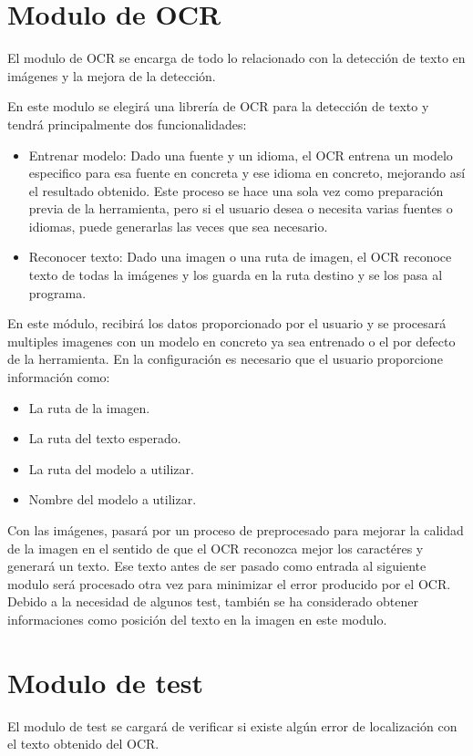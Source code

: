 \section{Modulo de OCR}
\label{sec:Modulo_OCR_Des}
El modulo de OCR se encarga de todo lo relacionado con la detección de texto en imágenes y la mejora de la detección.

En este modulo se elegirá una librería de OCR para la detección de texto y tendrá principalmente dos funcionalidades: 
\begin{itemize}
	\item Entrenar modelo: Dado una fuente y un idioma, el OCR entrena un modelo especifico para esa fuente en concreta y ese idioma en concreto, mejorando así el resultado obtenido. Este proceso se hace una sola vez como preparación previa de la herramienta, pero si el usuario desea o necesita varias fuentes o idiomas, puede generarlas las veces que sea necesario.
	\item Reconocer texto: Dado una imagen o una ruta de imagen, el OCR reconoce texto de todas la imágenes y los guarda en la ruta destino y se los pasa al programa. 
\end{itemize}
En este módulo, recibirá los datos proporcionado por el usuario y se procesará multiples imagenes con un modelo en concreto ya sea entrenado o el por defecto de la herramienta. En la configuración es necesario que el usuario proporcione información como:
\begin{itemize}
	\item La ruta de la imagen.
	\item La ruta del texto esperado.
	\item La ruta del modelo a utilizar.
	\item Nombre del modelo a utilizar.
\end{itemize}
Con las imágenes, pasará por un proceso de preprocesado para mejorar la calidad de la imagen en el sentido de que el OCR reconozca mejor los caractéres y generará un texto.
Ese texto antes de ser pasado como entrada al siguiente modulo será procesado otra vez para minimizar el error producido por el OCR.
Debido a la necesidad de algunos test, también se ha considerado obtener informaciones como posición del texto en la imagen en este modulo.
\section{Modulo de test}
El modulo de test se cargará de verificar si existe algún error de localización con el texto obtenido del OCR.


